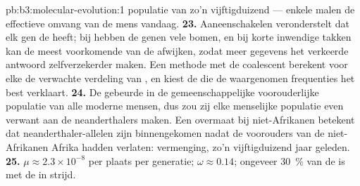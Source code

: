 \begin{solution}{pb:b3:molecular-evolution:1}
populatie van zo'n vijftigduizend --- enkele malen de effectieve omvang
van de mens vandaag.
\textbf{23.} Aaneenschakelen veronderstelt dat elk gen de 
heeft; bij  hebben de genen vele bomen,
en bij korte inwendige takken kan de meest voorkomende  van de
 afwijken, zodat meer gegevens het verkeerde antwoord
zelfverzekerder maken. Een methode met de coalescent berekent voor elke
 de verwachte verdeling van , en kiest de
 die de waargenomen frequenties het best verklaart.
\textbf{24.} De  gebeurde in de
gemeenschappelijke voorouderlijke populatie van alle moderne mensen, dus
zou zij elke menselijke populatie even verwant aan de neanderthalers
maken. Een overmaat bij niet-Afrikanen betekent dat neanderthaler-allelen
zijn binnengekomen nadat de voorouders van de niet-Afrikanen Afrika
hadden verlaten: vermenging, zo'n vijftigduizend jaar geleden.
\textbf{25.} $\mu \approx 2.3\times 10^{-8}$ per plaats per generatie;
$\omega \approx 0.14$; ongeveer \qty{30}{\%} van de  is met de
 in strijd.
\end{solution}
